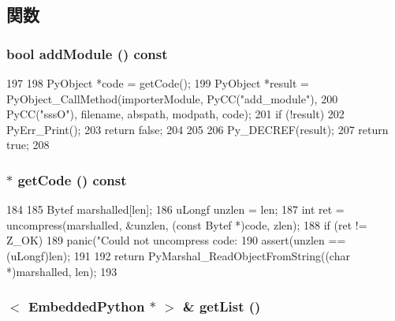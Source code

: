 \subsection{関数}
\hypertarget{structEmbeddedPython_afc01d2558f51232482f1c577efafa327}{
\subsubsection[{addModule}]{\setlength{\rightskip}{0pt plus 5cm}bool addModule () const}}
\label{structEmbeddedPython_afc01d2558f51232482f1c577efafa327}



\begin{DoxyCode}
197 {
198     PyObject *code = getCode();
199     PyObject *result = PyObject_CallMethod(importerModule, PyCC("add_module"),
200         PyCC("sssO"), filename, abspath, modpath, code);
201     if (!result) {
202         PyErr_Print();
203         return false;
204     }
205 
206     Py_DECREF(result);
207     return true;
208 }
\end{DoxyCode}
\hypertarget{structEmbeddedPython_ae39ff8f9293c5a762fc81e30a0db5ec9}{
\subsubsection[{getCode}]{ $\ast$ getCode () const}}
\label{structEmbeddedPython_ae39ff8f9293c5a762fc81e30a0db5ec9}



\begin{DoxyCode}
184 {
185     Bytef marshalled[len];
186     uLongf unzlen = len;
187     int ret = uncompress(marshalled, &unzlen, (const Bytef *)code, zlen);
188     if (ret != Z_OK)
189         panic("Could not uncompress code: %
190     assert(unzlen == (uLongf)len);
191 
192     return PyMarshal_ReadObjectFromString((char *)marshalled, len);
193 }
\end{DoxyCode}
\hypertarget{structEmbeddedPython_abf218b62a208b466b069e15e3afe8dae}{
\subsubsection[{getList}]{$<$ {\bf EmbeddedPython} $\ast$ $>$ \& getList ()}}
\label{structEmbeddedPython_abf218b62a208b466b069e15e3afe8dae}



